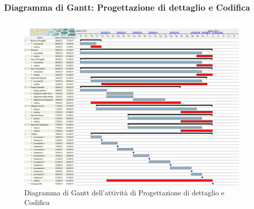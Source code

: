 \subsubsection{Diagramma di Gantt: Progettazione di dettaglio e Codifica}
\begin{figure}[h]
 	\centering
	\includegraphics[scale=0.35]{Images/GanttPianificazioneProgettazioneDettaglioCodifica.png}
	\caption{Diagramma di Gantt dell'attività di Progettazione di dettaglio e Codifica}
\end{figure}
